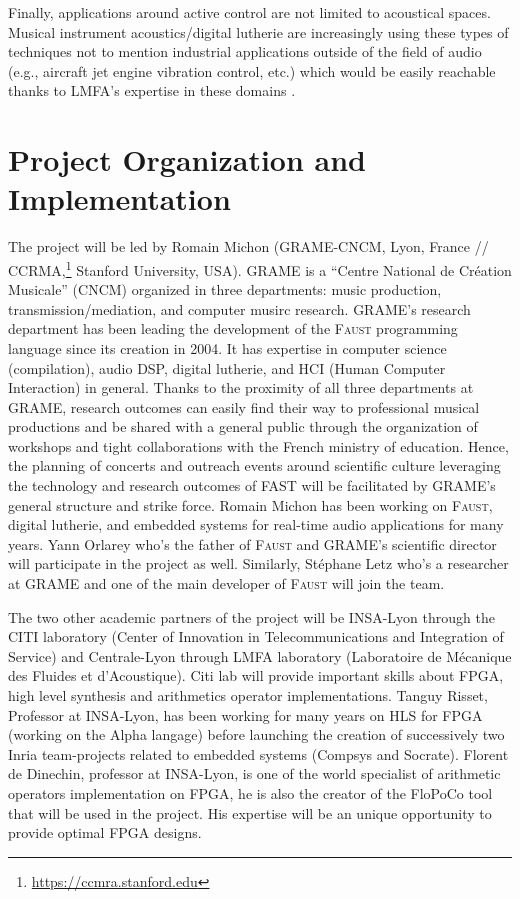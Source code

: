 \documentclass[a4paper,10pt]{article}
\newcommand{\F}{\textsc{Faust}}
\newcommand{\PP}{FAST}
\begin{document}
Finally, applications around active control are not limited to acoustical spaces. Musical instrument acoustics/digital lutherie are increasingly using these types of techniques \cite{Zhang2018} not to mention industrial applications outside of the field of audio (e.g., aircraft jet engine vibration control, etc.) which would be easily reachable thanks to LMFA's expertise in these domains \cite{salze2019new}.

\section*{Project Organization and Implementation}

The project will be led by Romain Michon (GRAME-CNCM, Lyon, France // CCRMA,\footnote{\url{https://ccmra.stanford.edu}} Stanford University, USA). GRAME is a ``Centre National de Création Musicale'' (CNCM) organized in three departments: music production, transmission/mediation, and computer musirc research. GRAME's research department has been leading the development of the \F{} programming language since its creation in 2004. It has expertise in computer science (compilation), audio DSP, digital lutherie, and HCI (Human Computer Interaction) in general. Thanks to the proximity of all three departments at GRAME, research outcomes can easily find their way to professional musical productions and be shared with a general public through the organization of workshops and tight collaborations with the French ministry of education. Hence, the planning of concerts and outreach events around scientific culture leveraging the technology and research outcomes of \PP{} will be facilitated by GRAME's general structure and strike force. Romain Michon has been working on \F{}, digital lutherie, and embedded systems for real-time audio applications for many years. Yann Orlarey who's the father of \F{} and GRAME's scientific director will participate in the project as well. Similarly, Stéphane Letz who's a researcher at GRAME and one of the main developer of \F{} will join the team. 

The two other academic partners of the project will be INSA-Lyon through  the CITI laboratory (Center of Innovation in Telecommunications and Integration of Service) and Centrale-Lyon through LMFA laboratory (Laboratoire de Mécanique des Fluides et d'Acoustique). Citi lab will provide important skills about FPGA, high level synthesis and arithmetics operator implementations. Tanguy Risset, Professor at INSA-Lyon,  has been working for many years on HLS for FPGA (working on the Alpha langage) before launching the creation of successively two Inria team-projects related to embedded systems (Compsys and Socrate). Florent de Dinechin, professor at INSA-Lyon, is one of the world specialist of arithmetic operators implementation on FPGA, he is also the creator of the FloPoCo tool that will be used in the project.  His expertise will be an unique opportunity to provide optimal  FPGA designs.
\end{document}

